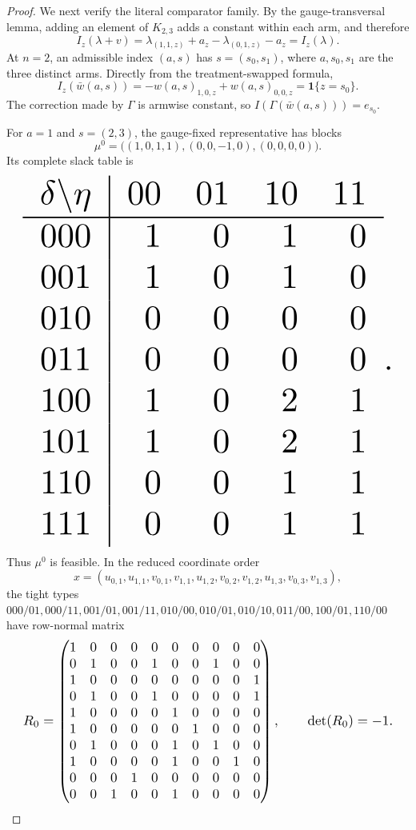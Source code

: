 \documentclass{article}
\begin{document}
\begin{proof}
We next verify the literal comparator family. By the gauge-transversal lemma, adding an element of \(K_{2,3}\) adds a constant within each arm, and therefore
\[I_z(\lambda+v)=\lambda_{(1,1,z)}+a_z-\lambda_{(0,1,z)}-a_z=I_z(\lambda).\]
At \(n=2\), an admissible index \((a,s)\) has \(s=(s_0,s_1)\), where \(a,s_0,s_1\) are the three distinct arms. Directly from the treatment-swapped formula,
\[I_z(\bar w(a,s))=-w(a,s)_{1,0,z}+w(a,s)_{0,0,z}=\mathbf1\{z=s_0\}.\]
The correction made by \(\Gamma\) is armwise constant, so \(I(\Gamma(\bar w(a,s)))=e_{s_0}\).

For \(a=1\) and \(s=(2,3)\), the gauge-fixed representative has blocks
\[\mu^0=\bigl((1,0,1,1),(0,0,-1,0),(0,0,0,0)\bigr).\]
Its complete slack table is
\[
\makebox[\linewidth][c]{\resizebox{0.98\linewidth}{!}{\par\noindent \makebox[\linewidth][c]{\resizebox{0.98\linewidth}{!}{\(\displaystyle \displaystyle \begin{array}{c|rrrr}\delta\backslash\eta&00&01&10&11\\ \hline 000&1&0&1&0\\001&1&0&1&0\\010&0&0&0&0\\011&0&0&0&0\\100&1&0&2&1\\101&1&0&2&1\\110&0&0&1&1\\111&0&0&1&1\end{array}.\)}}\par\noindent}}
\]
Thus \(\mu^0\) is feasible. In the reduced coordinate order
\[x=(u_{0,1},u_{1,1},v_{0,1},v_{1,1},u_{1,2},v_{0,2},v_{1,2},u_{1,3},v_{0,3},v_{1,3}),\]
the tight types \(000/01,000/11,001/01,001/11,010/00,010/01,010/10,011/00,100/01,110/00\) have row-normal matrix
\[
\makebox[\linewidth][c]{\resizebox{0.98\linewidth}{!}{\par\noindent \makebox[\linewidth][c]{\resizebox{0.98\linewidth}{!}{\(\displaystyle \displaystyle R_0=\begin{pmatrix}1&0&0&0&0&0&0&0&0&0\\0&1&0&0&1&0&0&1&0&0\\1&0&0&0&0&0&0&0&0&1\\0&1&0&0&1&0&0&0&0&1\\1&0&0&0&0&1&0&0&0&0\\1&0&0&0&0&0&1&0&0&0\\0&1&0&0&0&1&0&1&0&0\\1&0&0&0&0&1&0&0&1&0\\0&0&0&1&0&0&0&0&0&0\\0&0&1&0&0&1&0&0&0&0\end{pmatrix},\qquad\det(R_0)=-1.\)}}\par\noindent}}
\]
\end{proof}
\end{document}
